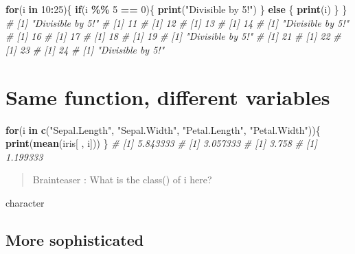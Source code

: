 \documentclass[
]{book}
\newenvironment{Shaded}{\begin{snugshade}}{\end{snugshade}}
\newcommand{\CommentTok}[1]{\textcolor[rgb]{0.56,0.35,0.01}{\textit{#1}}}
\newcommand{\ControlFlowTok}[1]{\textcolor[rgb]{0.13,0.29,0.53}{\textbf{#1}}}
\newcommand{\DecValTok}[1]{\textcolor[rgb]{0.00,0.00,0.81}{#1}}
\newcommand{\FunctionTok}[1]{\textcolor[rgb]{0.13,0.29,0.53}{\textbf{#1}}}
\newcommand{\NormalTok}[1]{#1}
\newcommand{\SpecialCharTok}[1]{\textcolor[rgb]{0.81,0.36,0.00}{\textbf{#1}}}
\newcommand{\StringTok}[1]{\textcolor[rgb]{0.31,0.60,0.02}{#1}}
\begin{document}
\begin{Shaded}
\begin{Highlighting}[]
\ControlFlowTok{for}\NormalTok{(i }\ControlFlowTok{in} \DecValTok{10}\SpecialCharTok{:}\DecValTok{25}\NormalTok{)\{}
  \ControlFlowTok{if}\NormalTok{(i }\SpecialCharTok{\%\%} \DecValTok{5} \SpecialCharTok{==} \DecValTok{0}\NormalTok{)\{}
    \FunctionTok{print}\NormalTok{(}\StringTok{"Divisible by 5!"}\NormalTok{)}
\NormalTok{  \} }\ControlFlowTok{else}\NormalTok{ \{}
    \FunctionTok{print}\NormalTok{(i) }
\NormalTok{  \}}
\NormalTok{\}}
\CommentTok{\# [1] "Divisible by 5!"}
\CommentTok{\# [1] 11}
\CommentTok{\# [1] 12}
\CommentTok{\# [1] 13}
\CommentTok{\# [1] 14}
\CommentTok{\# [1] "Divisible by 5!"}
\CommentTok{\# [1] 16}
\CommentTok{\# [1] 17}
\CommentTok{\# [1] 18}
\CommentTok{\# [1] 19}
\CommentTok{\# [1] "Divisible by 5!"}
\CommentTok{\# [1] 21}
\CommentTok{\# [1] 22}
\CommentTok{\# [1] 23}
\CommentTok{\# [1] 24}
\CommentTok{\# [1] "Divisible by 5!"}
\end{Highlighting}
\end{Shaded}

\section{Same function, different variables}\label{same-function-different-variables}

\begin{Shaded}
\begin{Highlighting}[]
\ControlFlowTok{for}\NormalTok{(i }\ControlFlowTok{in} \FunctionTok{c}\NormalTok{(}\StringTok{"Sepal.Length"}\NormalTok{, }\StringTok{"Sepal.Width"}\NormalTok{, }\StringTok{"Petal.Length"}\NormalTok{, }\StringTok{"Petal.Width"}\NormalTok{))\{}
  \FunctionTok{print}\NormalTok{(}\FunctionTok{mean}\NormalTok{(iris[ , i]))}
\NormalTok{\}}
\CommentTok{\# [1] 5.843333}
\CommentTok{\# [1] 3.057333}
\CommentTok{\# [1] 3.758}
\CommentTok{\# [1] 1.199333}
\end{Highlighting}
\end{Shaded}

\begin{quote}
Brainteaser :
What is the class() of i here?
\end{quote}

character

\subsection{More sophisticated}\label{more-sophisticated}
\end{document}
